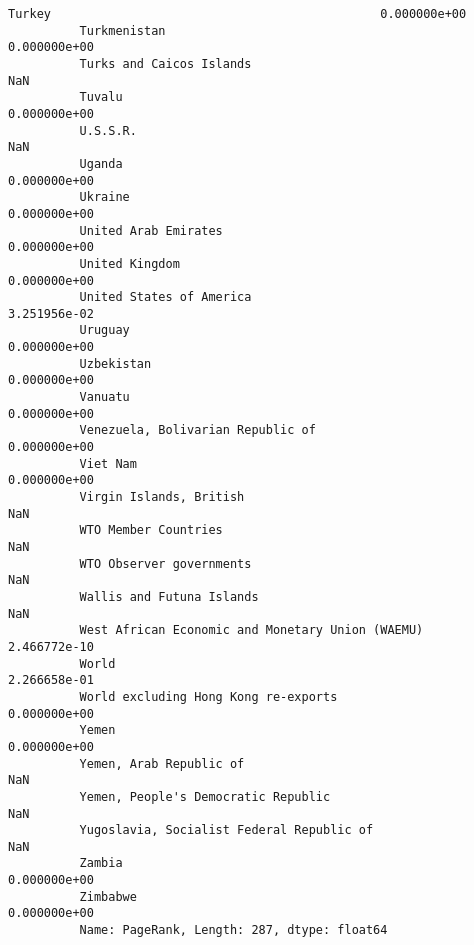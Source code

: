 \documentclass[11pt]{article}
\begin{document}
\begin{Verbatim}[commandchars=\\\{\}]
          Turkey                                              0.000000e+00
          Turkmenistan                                        0.000000e+00
          Turks and Caicos Islands                                     NaN
          Tuvalu                                              0.000000e+00
          U.S.S.R.                                                     NaN
          Uganda                                              0.000000e+00
          Ukraine                                             0.000000e+00
          United Arab Emirates                                0.000000e+00
          United Kingdom                                      0.000000e+00
          United States of America                            3.251956e-02
          Uruguay                                             0.000000e+00
          Uzbekistan                                          0.000000e+00
          Vanuatu                                             0.000000e+00
          Venezuela, Bolivarian Republic of                   0.000000e+00
          Viet Nam                                            0.000000e+00
          Virgin Islands, British                                      NaN
          WTO Member Countries                                         NaN
          WTO Observer governments                                     NaN
          Wallis and Futuna Islands                                    NaN
          West African Economic and Monetary Union (WAEMU)    2.466772e-10
          World                                               2.266658e-01
          World excluding Hong Kong re-exports                0.000000e+00
          Yemen                                               0.000000e+00
          Yemen, Arab Republic of                                      NaN
          Yemen, People's Democratic Republic                          NaN
          Yugoslavia, Socialist Federal Republic of                    NaN
          Zambia                                              0.000000e+00
          Zimbabwe                                            0.000000e+00
          Name: PageRank, Length: 287, dtype: float64
\end{Verbatim}
            
\end{document}
